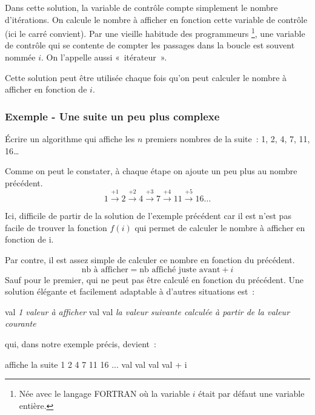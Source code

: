 		Dans cette solution,
		la variable de contrôle compte simplement le nombre d’itérations.
		On calcule le nombre à afficher en fonction cette variable de contrôle 
		(ici le carré convient).
		Par une vieille habitude des programmeurs%
		\footnote{%
			Née avec le langage FORTRAN 
			où la variable $i$ était par défaut une variable entière.
		},
		une variable de contrôle 
		qui se contente de compter les passages dans la boucle 
		est souvent nommée $i$. 
		On l’appelle aussi «~itérateur~».	

		Cette solution peut être utilisée
		chaque fois qu’on peut calculer le nombre à afficher
		en fonction de $i$.
		
	\subsubsection{Exemple - Une suite un peu plus complexe}
	 
		Écrire un algorithme qui affiche 
		les $n$ premiers nombres de la suite~:
		1, 2, 4, 7, 11, 16\dots{}
		
		Comme on peut le constater, 
		à chaque étape on ajoute un peu plus au nombre précédent.
		\[ 
			1 
			\xrightarrow{+1} 2 
			\xrightarrow{+2} 4
			\xrightarrow{+3} 7 
			\xrightarrow{+4} 11 
			\xrightarrow{+5} 16 
			\dots
		\] 

		Ici, difficile de partir de la solution de l’exemple précédent
		car il est n’est pas facile de trouver la fonction $f(i)$
		qui permet de calculer le nombre à afficher en fonction de i. 
		
		Par contre, il est assez simple de calculer ce nombre 
		en fonction du précédent.
		\[
			\mbox{nb à afficher} = \mbox{nb affiché juste avant} + i
		\]
		Sauf pour le premier, qui ne peut pas être calculé
		en fonction du précédent.
		Une solution élégante et facilement adaptable
		à d’autres situations est~:
		
		\begin{LDA}
				\Let val \Gets \textit{1\iere{} valeur à afficher}
					\Write val
					\Let val \Gets \textit{la valeur suivante calculée à partir de la valeur courante}
				\EndFor
			\EndAlgo
		\end{LDA}
		
		qui, dans notre exemple précis, devient~:

		\begin{LDA}
			\LComment affiche la suite 1 2 4 7 11 16 ...
			\Algo{suite}{\Par{n}{entier}}{}
				\Decl{val}{entier}
				\Let val \Gets 1
				\For{i}{1}{n}
					\Write val
					\Let val \Gets val + i
				\EndFor
			\EndAlgo
		\end{LDA}

